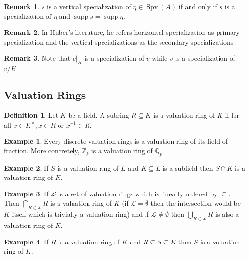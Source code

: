 \documentclass[10pt]{article}
\numberwithin{equation}{section}
\theoremstyle{definition}
\newtheorem{definition}{Definition}[subsection]
\newtheorem{remark}{Remark}[subsection]
\newtheorem{example}{Example}[subsection]
\DeclareMathOperator{\supp}{supp}
\DeclareMathOperator{\Spv}{Spv}
\newcommand{\Z}[0]{\mathbb{Z}}
\newcommand{\Q}[0]{\mathbb{Q}}
\newcommand{\tor}[0]{\text{ or }}
\begin{document}
\begin{remark}
    $s$ is a vertical specialization of $\eta\in\Spv(A)$ if and only if $s$ is a specialization of $\eta$ and $\supp s = \supp \eta$.
\end{remark}
\begin{remark}
    In Huber's literature, he refers horizontal specialization as primary specialization and the vertical specializations as the secondary specializations.
\end{remark}

\begin{remark}
    Note that $v|_H$ is a specialization of $v$ while $v$ is a specialization of $v/H$.
\end{remark}

\subsection{Valuation Rings}

\begin{definition}
    Let $K$ be a field. A subring $R\subseteq K$ is a valuation ring of $K$ if for all $x\in K^\times, x\in R\tor x^{-1}\in R$.
\end{definition}

\begin{example}
    Every discrete valuation rings is a valuation ring of its field of fraction. More concretely, $\Z_p$ is a valuation ring of $\Q_p$.
\end{example}
\begin{example}
    If $S$ is a valuation ring of $L$ and $K\subseteq L$ is a subfield then $S\cap K$ is a valuation ring of $K$.
\end{example}

\begin{example}
    If $\mathcal{L}$ is a set of valuation rings which is linearly ordered by $\subseteq$. Then $\bigcap_{R\in\mathcal{L}}R$ is a valuation ring of $K$ (if $\mathcal{L}=\emptyset$ then the intersection would be $K$ itself which is trivially a valuation ring) and if $\mathcal{L}\not=\emptyset$ then $\bigcup_{R\in\mathcal{L}}R$ is also a valuation ring of $K$.
\end{example}

\begin{example}
    If $R$ is a valuation ring of $K$ and $R\subseteq S\subseteq K$ then $S$ is a valuation ring of $K$.
\end{example}
\end{document}
